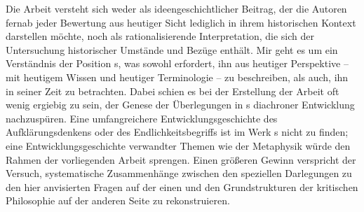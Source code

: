 Die Arbeit versteht sich weder als ideengeschichtlicher Beitrag, der die Autoren
fernab jeder Bewertung aus heutiger Sicht lediglich in ihrem historischen
Kontext darstellen möchte, noch als rationalisierende Interpretation, die sich
der Untersuchung historischer Umstände und Bezüge enthält. Mir geht es um ein
Verständnis der Position s, was sowohl erfordert, ihn aus
heutiger Perspektive -- mit heutigem Wissen und heutiger Terminologie -- zu
beschreiben, als auch, ihn in seiner Zeit zu betrachten.
Dabei schien es bei der Erstellung der Arbeit oft wenig ergiebig zu sein, der
Genese der Überlegungen in s diachroner Entwicklung nachzuspüren. Eine
umfangreichere Entwicklungsgeschichte des Aufklärungsdenkens oder des
Endlichkeitsbegriffs ist im Werk s nicht zu finden; eine
Entwicklungsgeschichte verwandter Themen wie der Metaphysik würde den Rahmen
der vorliegenden Arbeit sprengen. Einen größeren Gewinn verspricht der Versuch,
systematische Zusammenhänge zwischen den speziellen Darlegungen zu den hier
anvisierten Fragen auf der einen und den Grundstrukturen der kritischen
Philosophie auf der anderen Seite zu rekonstruieren.


